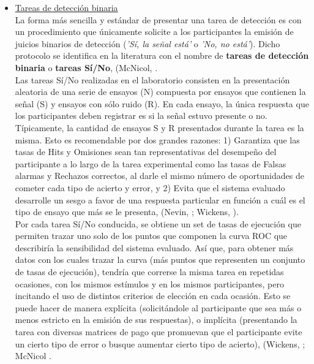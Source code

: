 \begin{itemize}
\item \underline{Tareas de detección binaria}\\

La forma más sencilla y estándar de presentar una tarea de detección es con un procedimiento que únicamente solicite a los participantes la emisión de juicios binarios de detección (\textit{'Sí, la señal está'} o \textit{'No, no está'}). Dicho protocolo se identifica en la literatura con el nombre de \textbf{tareas de detección binaria} o \textbf{tareas Sí/No}, (McNicol, \citeyear{McNicol2)}.\\

Las tareas Sí/No realizadas en el laboratorio consisten en la presentación aleatoria de una serie de ensayos (N) compuesta por ensayos que contienen la señal (S) y ensayos con sólo ruido (R). En cada ensayo, la única respuesta que los participantes deben registrar es si la señal estuvo presente o no.\\

Típicamente, la cantidad de ensayos S y R presentados durante la tarea es la misma. Esto es recomendable por dos grandes razones: 1) Garantiza que las tasas de Hits y Omisiones sean tan representativas del desempeño del participante a lo largo de la tarea experimental como las tasas de Falsas alarmas y Rechazos correctos, al darle el mismo número de oportunidades de cometer cada tipo de acierto y error, y 2) Evita que el sistema evaluado desarrolle un sesgo a favor de una respuesta particular en función a cuál es el tipo de ensayo que más se le presenta, (Nevin, \citeyear{Nevin1969}; Wickens, \citeyear{Wickens1}).\\

Por cada tarea Sí/No conducida, se obtiene un set de tasas de ejecución que permiten trazar uno solo de los puntos que componen la curva ROC que describiría la sensibilidad del sistema evaluado. Así que, para obtener más datos con los cuales trazar la curva (más puntos que representen un conjunto de tasas de ejecución), tendría que correrse la misma tarea en repetidas ocasiones, con los mismos estímulos y en los mismos participantes, pero incitando el uso de distintos criterios de elección en cada ocasión. Esto se puede hacer de manera explícita (solicitándole al participante que sea más o menos estricto en la emisión de sus respuestas), o implícita (presentando la tarea con diversas matrices de pago que promuevan que el participante evite un cierto tipo de error o busque aumentar cierto tipo de acierto), (Wickens, \citeyear{Wickens1}; McNicol \citeyear{McNicol2}.\\


\end{itemize}
